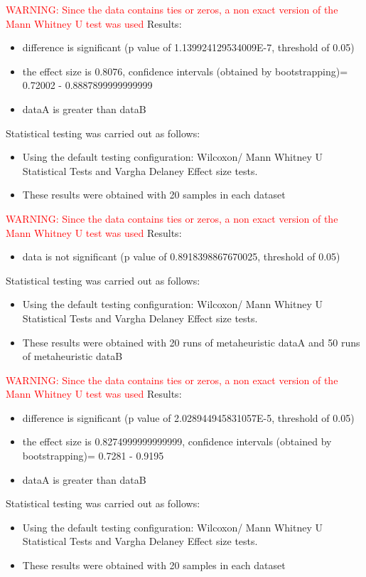 \documentclass[]{article}
\begin{document}
\textcolor{Red}{WARNING: Since the data contains ties or zeros, a non exact version of the Mann Whitney U test was used
}
Results:
\begin{itemize}
\item{difference is significant (p value of 1.139924129534009E-7, threshold of 0.05)}
\item{the effect size is 0.8076, confidence intervals (obtained by bootstrapping)= 0.72002 - 0.8887899999999999}
\item{dataA is greater than dataB}
\end{itemize}Statistical testing was carried out as follows: \begin{itemize}
\item{Using the default testing configuration: Wilcoxon/ Mann Whitney U Statistical Tests and Vargha Delaney Effect size tests.}
\item{These results were obtained with 20 samples in each dataset}
\end{itemize}
\textcolor{Red}{WARNING: Since the data contains ties or zeros, a non exact version of the Mann Whitney U test was used
}
Results:
\begin{itemize}
\item{data is not significant (p value of 0.8918398867670025, threshold of 0.05)}
\end{itemize}Statistical testing was carried out as follows: \begin{itemize}
\item{Using the default testing configuration: Wilcoxon/ Mann Whitney U Statistical Tests and Vargha Delaney Effect size tests.}
\item{These results were obtained with 20 runs of metaheuristic dataA and 50 runs of metaheuristic dataB}
\end{itemize}
\textcolor{Red}{WARNING: Since the data contains ties or zeros, a non exact version of the Mann Whitney U test was used
}
Results:
\begin{itemize}
\item{difference is significant (p value of 2.028944945831057E-5, threshold of 0.05)}
\item{the effect size is 0.8274999999999999, confidence intervals (obtained by bootstrapping)= 0.7281 - 0.9195}
\item{dataA is greater than dataB}
\end{itemize}Statistical testing was carried out as follows: \begin{itemize}
\item{Using the default testing configuration: Wilcoxon/ Mann Whitney U Statistical Tests and Vargha Delaney Effect size tests.}
\item{These results were obtained with 20 samples in each dataset}
\end{itemize}
\end{document}
